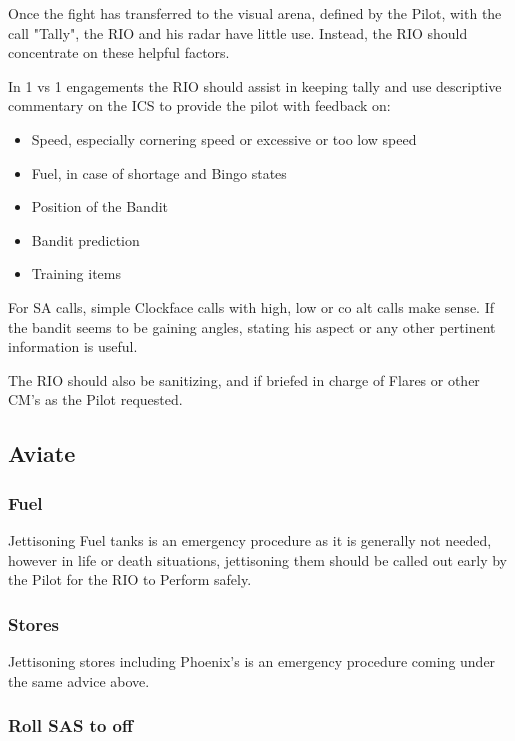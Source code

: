 Once the fight has transferred to the visual arena, defined by the Pilot, with
the call "Tally", the RIO and his radar have little use. Instead, the RIO
should concentrate on these helpful factors.

In 1 vs 1 engagements the RIO should assist in keeping tally and use
descriptive commentary on the ICS to provide the pilot with feedback on:

\begin{itemize}
 \item Speed, especially cornering speed or excessive or too low speed
 \item Fuel, in case of shortage and Bingo states
 \item Position of the Bandit
 \item Bandit prediction
 \item Training items
\end{itemize}

For SA calls, simple Clockface calls with high, low or co alt calls make sense.
If the bandit seems to be gaining angles, stating his aspect or any other
pertinent information is useful.

The RIO should also be sanitizing, and if briefed in charge of Flares or other
CM's as the Pilot requested.

\newpage

\subsection{Aviate}

\subsubsection*{Fuel}

Jettisoning Fuel tanks is an emergency procedure as it is generally not needed,
however in life or death situations, jettisoning them should be called out
early by the Pilot for the RIO to Perform safely.

\subsubsection*{Stores}

Jettisoning stores including Phoenix's is an emergency procedure coming under
the same advice above.

\subsubsection*{Roll SAS to off}

